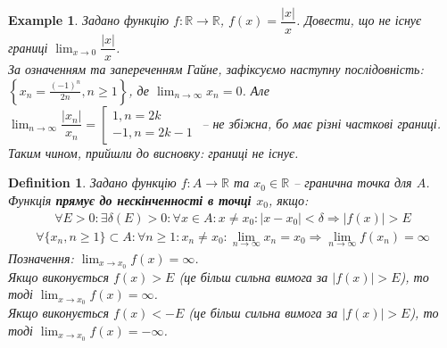 \documentclass[a4paper, 14pt]{article}
\theoremstyle{theoremdd}
\theoremstyle{theoremdd}
\newtheorem{definition}[theorem]{Definition}
\theoremstyle{theoremdd}
\theoremstyle{theoremdd}
\newtheorem{example}[theorem]{Example}
\theoremstyle{theoremdd}
\theoremstyle{theoremdd}
\theoremstyle{theoremdd}
\theoremstyle{theoremdd}
\begin{document}
	\begin{example}
	Задано функцію $f \colon \mathbb{R} \to \mathbb{R}$, $f(x) = \dfrac{|x|}{x}$. Довести, що не існує границі $\displaystyle \lim_{x \to 0} \dfrac{|x|}{x}$.\\
	За означенням та запереченням Гайне, зафіксуємо наступну послідовність: $\displaystyle \left\{x_n = \frac{(-1)^n}{2n}, n \geq 1\right\}$, де $\displaystyle \lim_{n \to \infty} x_n = 0$. Але $\displaystyle \lim_{n \to \infty} \dfrac{|x_n|}{x_n} = \left[ \begin{gathered} 1, n = 2k \\ -1, n = 2k-1 \end{gathered} \right.$ -- не збіжна, бо має різні часткові границі.\\
	Таким чином, прийшли до висновку: границі не існує.
\\ \iffalse %
	\begin{figure} [H]
	\centering
	\begin{tikzpicture}
	\draw[thick, ->] (-2,0)--(2,0) node[anchor = north] {$x$};
	\draw[thick, ->] (0,-2)--(0,2.1) node[anchor = east] {$y$};
		\draw[thick, domain=0.01:2, variable=\x] plot({\x}, {1}) node[anchor = west] {$f(x) = \dfrac{|x|}{x}$};
		\draw[thick, domain=-2:-0.01, variable=\x] plot({\x}, {-1});
	
	\draw[fill = white](0,-1) circle(2pt);
	\draw[fill = white](0,1) circle(2pt);
	\foreach \x in {1,2,...,20}
		\fill[red] ({2*((-1)^(\x))/(\x)},{0}) circle (1pt);

	\end{tikzpicture}
	\caption*{Червоні точки наближаються до нуля, але функція в цих точках скаче.}
	\end{figure}
\fi %
	\end{example}
	
		\begin{definition}
	Задано функцію $f \colon A \to \mathbb{R}$ та $x_0 \in \mathbb{R}$ -- гранична точка для $A$.\\
	Функція \textbf{прямує до нескінченності в точці $x_0$}, якщо:
	\begin{align*}
	\forall E > 0: \exists \delta(E) > 0: \forall x \in A: x \neq x_0: |x-x_0|<\delta \Rightarrow |f(x)|>E \tag*{означення Коші}
	\end{align*}
	\begin{align*}
	\forall \{x_n, n \geq 1\}\subset A: \forall n \geq 1: x_n \neq x_0: \lim_{n \to \infty} x_n = x_0 \Rightarrow \lim_{n \to \infty} f(x_n) = \infty \tag*{означення Гайне}
	\end{align*}
	Позначення: $\displaystyle \lim_{x \to x_0} f(x) = \infty$.\\
	Якщо виконується $f(x) > E$ (це більш сильна вимога за $|f(x)| > E$), то тоді $\displaystyle \lim_{x \to x_0} f(x) = \infty$.\\
	Якщо виконується $f(x) < -E$ (це більш сильна вимога за $|f(x)| > E$), то тоді $\displaystyle \lim_{x \to x_0} f(x) = -\infty$.
	\end{definition}
	
\end{document}

